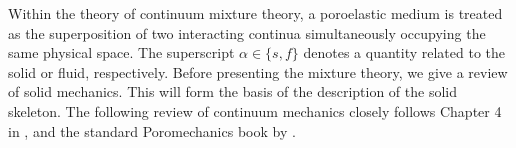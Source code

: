 Within the theory of continuum mixture theory, a poroelastic medium is treated as the superposition of
two interacting continua simultaneously occupying the same physical space. The
superscript $\alpha \in \lbrace s, f \rbrace$ denotes a quantity related to the solid or fluid, respectively. Before presenting the mixture theory, we give a review of solid mechanics. This will form the basis of the description of the solid skeleton. The following review of continuum mechanics closely follows Chapter 4 in \citet{gonzalez2008first}, and the standard Poromechanics book by \citet{coussy2004poromechanics}. %
\begin{figure}[H]
\begin{center}

\end{center}
\end{figure}
